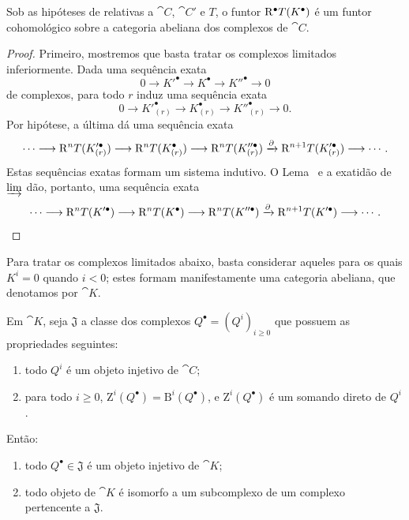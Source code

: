 \begin{proposition}[11.5.2]
\label{0.11.5.2}
Sob as hipóteses de  relativas a $\cat{C}$, $\cat{C}'$ e $T$, o funtor $\mathrm{R}^\bullet T(K^\bullet)$ é um funtor cohomológico sobre a categoria abeliana dos complexos de $\cat{C}$.
\end{proposition}

\begin{proof}
Primeiro, mostremos que basta tratar os complexos limitados inferiormente.
Dada uma sequência exata
\[
  0\longrightarrow K'^\bullet\longrightarrow K^\bullet
  \longrightarrow K''^\bullet\longrightarrow 0
\]
de complexos, para todo $r$ induz uma sequência exata
\[
  0\longrightarrow K'^\bullet_{(r)}\longrightarrow K^\bullet_{(r)}
  \longrightarrow K''^\bullet_{(r)}\longrightarrow 0.
\]
Por hipótese, a última dá uma sequência exata
\[
  \cdots\longrightarrow\mathrm{R}^nT(K'^\bullet_{(r)})
  \longrightarrow\mathrm{R}^nT(K^\bullet_{(r)})
  \longrightarrow\mathrm{R}^nT(K''^\bullet_{(r)})
  \xrightarrow{\partial}\mathrm{R}^{n+1}T(K'^\bullet_{(r)})
  \longrightarrow\cdots .
\]
Estas sequências exatas formam um sistema indutivo.
O Lema~ e a exatidão de $\varinjlim$ dão, portanto, uma sequência exata
\[
  \cdots\longrightarrow\mathrm{R}^nT(K'^\bullet)
  \longrightarrow\mathrm{R}^nT(K^\bullet)
  \longrightarrow\mathrm{R}^nT(K''^\bullet)
  \xrightarrow{\partial}\mathrm{R}^{n+1}T(K'^\bullet)
  \longrightarrow\cdots .
\]
\end{proof}

Para tratar os complexos limitados abaixo, basta considerar aqueles para os quais $K^i=0$ quando $i<0$; estes formam manifestamente uma categoria abeliana, que denotamos por $\cat{K}$.

\begin{lemma}[11.5.2.1]
\label{0.11.5.2.1}
Em $\cat{K}$, seja $\mathfrak{J}$ a classe dos complexos $Q^\bullet=(Q^i)_{i\geq0}$ que possuem as
propriedades seguintes:
\begin{enumerate}
  \item[{\rm(1) }] todo $Q^i$ é um objeto injetivo de $\cat{C}$;
  \item[{\rm(2) }] para todo $i\geq0$, $\mathrm{Z}^i(Q^\bullet)=\mathrm{B}^i(Q^\bullet)$, e $\mathrm{Z}^i(Q^\bullet)$ é um somando direto de $Q^i$.
\end{enumerate}
Então:
\begin{enumerate}
  \item[{\rm(i) }] todo $Q^\bullet\in\mathfrak{J}$ é um objeto injetivo de $\cat{K}$;
  \item[{\rm(ii) }] todo objeto de $\cat{K}$ é isomorfo a um subcomplexo de um complexo pertencente a $\mathfrak{J}$.
\end{enumerate}
\end{lemma}

